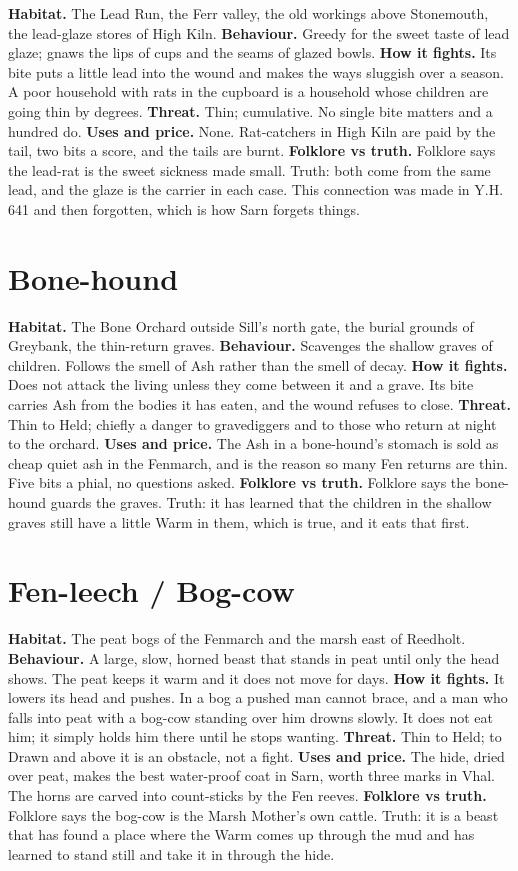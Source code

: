 \documentclass{design/chronicle}
\begin{document}
\textbf{Habitat.} The Lead Run, the Ferr valley, the old workings above Stonemouth, the lead-glaze stores of High Kiln. \textbf{Behaviour.} Greedy for the sweet taste of lead glaze; gnaws the lips of cups and the seams of glazed bowls. \textbf{How it fights.} Its bite puts a little lead into the wound and makes the ways sluggish over a season. A poor household with rats in the cupboard is a household whose children are going thin by degrees. \textbf{Threat.} Thin; cumulative. No single bite matters and a hundred do. \textbf{Uses and price.} None. Rat-catchers in High Kiln are paid by the tail, two bits a score, and the tails are burnt. \textbf{Folklore vs truth.} Folklore says the lead-rat is the sweet sickness made small. Truth: both come from the same lead, and the glaze is the carrier in each case. This connection was made in Y.H. 641 and then forgotten, which is how Sarn forgets things.

\section*{Bone-hound}

\textbf{Habitat.} The Bone Orchard outside Sill’s north gate, the burial grounds of Greybank, the thin-return graves. \textbf{Behaviour.} Scavenges the shallow graves of children. Follows the smell of Ash rather than the smell of decay. \textbf{How it fights.} Does not attack the living unless they come between it and a grave. Its bite carries Ash from the bodies it has eaten, and the wound refuses to close. \textbf{Threat.} Thin to Held; chiefly a danger to gravediggers and to those who return at night to the orchard. \textbf{Uses and price.} The Ash in a bone-hound’s stomach is sold as cheap quiet ash in the Fenmarch, and is the reason so many Fen returns are thin. Five bits a phial, no questions asked. \textbf{Folklore vs truth.} Folklore says the bone-hound guards the graves. Truth: it has learned that the children in the shallow graves still have a little Warm in them, which is true, and it eats that first.

\section*{Fen-leech / Bog-cow}

\textbf{Habitat.} The peat bogs of the Fenmarch and the marsh east of Reedholt. \textbf{Behaviour.} A large, slow, horned beast that stands in peat until only the head shows. The peat keeps it warm and it does not move for days. \textbf{How it fights.} It lowers its head and pushes. In a bog a pushed man cannot brace, and a man who falls into peat with a bog-cow standing over him drowns slowly. It does not eat him; it simply holds him there until he stops wanting. \textbf{Threat.} Thin to Held; to Drawn and above it is an obstacle, not a fight. \textbf{Uses and price.} The hide, dried over peat, makes the best water-proof coat in Sarn, worth three marks in Vhal. The horns are carved into count-sticks by the Fen reeves. \textbf{Folklore vs truth.} Folklore says the bog-cow is the Marsh Mother’s own cattle. Truth: it is a beast that has found a place where the Warm comes up through the mud and has learned to stand still and take it in through the hide.
\end{document}
